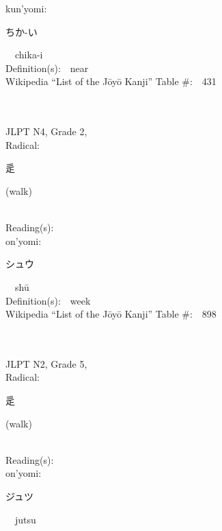 \begin{multicols}{2}
{\hspace*{1em}}kun'yomi:\ \ \\
{\hspace*{2em}}{\begin{CJK}{UTF8}{min} ちか-い \end{CJK}}\ \ chika-i\ \ \\
Definition(s):\ \ near \\
Wikipedia ``List of the J\=oy\=o Kanji'' Table \#:\ \ 431 \\
\ \ \\
{\fontsize{34pt}{40pt}  }\ \ \\  %
{JLPT N4, Grade 2, \\Radical:\ \ {\begin{CJK}{UTF8}{min} 辵 \end{CJK}} (walk) } \\
Reading(s):\ \ \\
{\hspace*{1em}}on'yomi:\ \ \\
{\hspace*{2em}}{\begin{CJK}{UTF8}{min} シュウ \end{CJK}}\ \ sh\=u\ \ \\
Definition(s):\ \ week \\
Wikipedia ``List of the J\=oy\=o Kanji'' Table \#:\ \ 898 \\
\ \ \\
{\fontsize{34pt}{40pt}  }\ \ \\  %
{JLPT N2, Grade 5, \\Radical:\ \ {\begin{CJK}{UTF8}{min} 辵 \end{CJK}} (walk) } \\
Reading(s):\ \ \\
{\hspace*{1em}}on'yomi:\ \ \\
{\hspace*{2em}}{\begin{CJK}{UTF8}{min} ジュツ \end{CJK}}\ \ jutsu\ \ \\

\end{multicols}
